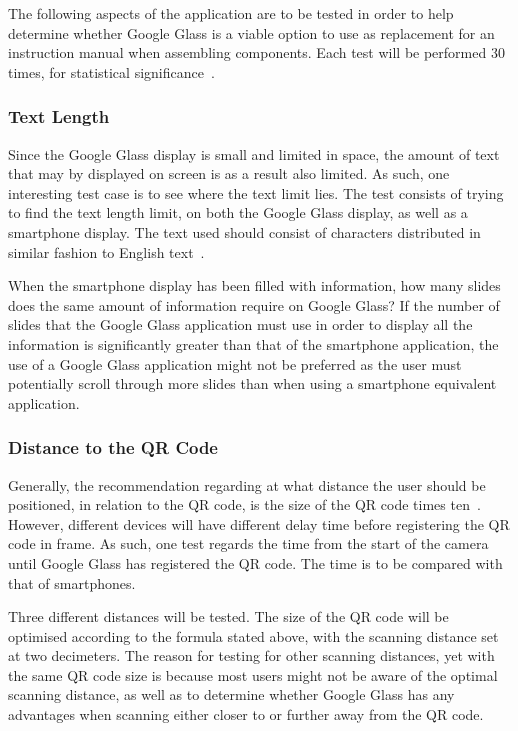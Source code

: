 The following aspects of the application are to be tested in order to help determine whether Google Glass is a viable option to use as replacement for an instruction manual when assembling components. Each test will be performed 30 times, for statistical significance~\cite{30sampleSize}.

\subsubsection{Text Length}
Since the Google Glass display is small and limited in space, the amount of text that may by displayed on screen is as a result also limited. As such, one interesting test case is to see where the text limit lies. The test consists of trying to find the text length limit, on both the Google Glass display, as well as a smartphone display. The text used should consist of characters distributed in similar fashion to English text~\cite{englishTextStat}.

When the smartphone display has been filled with information, how many slides does the same amount of information require on Google Glass? If the number of slides that the Google Glass application must use in order to display all the information is significantly greater than that of the smartphone application, the use of a Google Glass application might not be preferred as the user must potentially scroll through more slides than when using a smartphone equivalent application.



\subsubsection{Distance to the QR Code}
Generally, the recommendation regarding at what distance the user should be positioned, in relation to the QR code, is the size of the QR code times ten~\cite{qrCodeSizeComplexity}. However, different devices will have different delay time before registering the QR code in frame. As such, one test regards the time from the start of the camera until Google Glass has registered the QR code. The time is to be compared with that of smartphones.

Three different distances will be tested. The size of the QR code will be optimised according to the formula stated above, with the scanning distance set at two decimeters. The reason for testing for other scanning distances, yet with the same QR code size is because most users might not be aware of the optimal scanning distance, as well as to determine whether Google Glass has any advantages when scanning either closer to or further away from the QR code.

